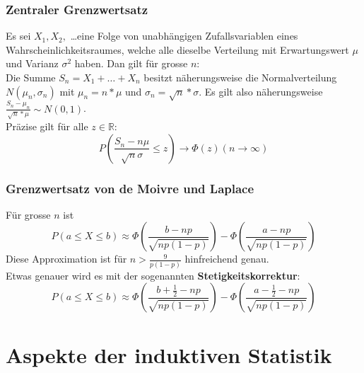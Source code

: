 \documentclass[10pt]{article}
\newtheorem[M]{definition}{Def.}
\newtheorem[M]{satz}{Satz}
\numberwithin{equation}{section}
\newcommand{\RN}{\mathbb{R}} %
\begin{document}
\subsubsection{Zentraler Grenzwertsatz}
Es sei $X_1, X_2,$ \dots eine Folge von unabhängigen Zufallsvariablen eines  Wahrscheinlichkeitsraumes, welche alle dieselbe Verteilung mit Erwartungswert $\mu$ und Varianz $\sigma^2$ haben. Dan gilt für grosse $n$: \\
Die Summe $S_n = X_1 + \dots + X_n$ besitzt näherungsweise die Normalverteilung $N(\mu_n, \sigma_n)$ mit $\mu_n = n * \mu$ und $\sigma_n = \sqrt{n} * \sigma$. Es gilt also näherungsweise $ \frac{S_n - \mu_n}{\sqrt{n} * \mu} \sim N(0,1)$. \\
Präzise gilt für alle $z \in \RN$:
\begin{equation}
P(\frac{S_n - n\mu}{\sqrt{n}\sigma} \leq z) \rightarrow \Phi(z) (n \rightarrow \infty)
\end{equation}
\subsubsection{Grenzwertsatz von de Moivre und Laplace}
Für grosse $n$ ist
\begin{equation}
P(a \leq X \leq b) \approx \Phi (\frac{b - np}{\sqrt{np(1-p)}}) - \Phi (\frac{a - np}{\sqrt{np(1-p)}})
\end{equation}
Diese Approximation ist für $n > \frac{9}{p(1-p)}$ hinfreichend genau. \\
Etwas genauer wird es mit der sogenannten \textbf{Stetigkeitskorrektur}:
\begin{equation}
P(a \leq X \leq b) \approx \Phi(\frac{b + \frac{1}{2} - np}{\sqrt{np(1-p)}}) - \Phi(\frac{a - \frac{1}{2} - np}{\sqrt{np(1-p)}})
\end{equation}

\newpage
\section{Aspekte der induktiven Statistik}

\end{document}
